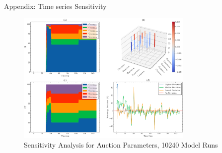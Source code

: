 \documentclass{beamer}
\begin{document}
\begin{frame}{Appendix: Time series Sensitivity}
\begin{figure}
\centering
\includegraphics[width=85mm]{Figs/SOBOL_time_series_for_problem_cliplike_n10.pdf}
\caption{Sensitivity Analysis for Auction Parameters, 10240 Model Runs}
\label{fig4}
\end{figure}
\end{frame}
\end{document}
